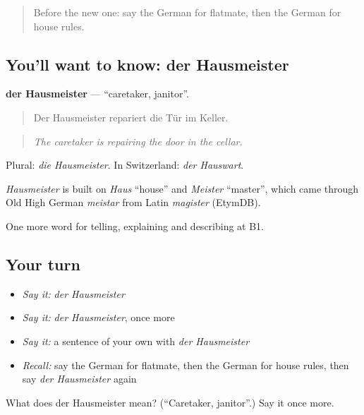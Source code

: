 \begin{quote}
Before the new one: say the German for flatmate, then the German for house rules.
\end{quote}

\subsection*{You'll want to know: der Hausmeister}
\textbf{der Hausmeister} — \textquotedblleft{}caretaker, janitor\textquotedblright{}.

\begin{quote}
Der Hausmeister repariert die Tür im Keller.
\end{quote}

\begin{quote}
\emph{The caretaker is repairing the door in the cellar.}
\end{quote}

Plural: \emph{die Hausmeister}. In Switzerland: \emph{der Hauswart}.

\begin{cousinweb}
\emph{Hausmeister} is built on \emph{Haus} \textquotedblleft{}house\textquotedblright{} and \emph{Meister} \textquotedblleft{}master\textquotedblright{}, which came through Old High German \emph{meistar} from Latin \emph{magister} (EtymDB).
\end{cousinweb}

\begin{grammarlens}[title={What you've built}]
One more word for telling, explaining and describing at B1.
\end{grammarlens}

\subsection*{Your turn}
\begin{itemize}
\raggedright
  \item \emph{Say it:} \emph{der Hausmeister}
  \item \emph{Say it:} \emph{der Hausmeister}, once more
  \item \emph{Say it:} a sentence of your own with \emph{der Hausmeister}
  \item \emph{Recall:} say the German for flatmate, then the German for house rules, then say \emph{der Hausmeister} again
\end{itemize}

\begin{tcolorbox}[breakable,colback=teal!4,colframe=teal!35!black,title={Before you move on}]
What does der Hausmeister mean? (\textquotedblleft{}Caretaker, janitor\textquotedblright{}.) Say it once more.
\end{tcolorbox}
